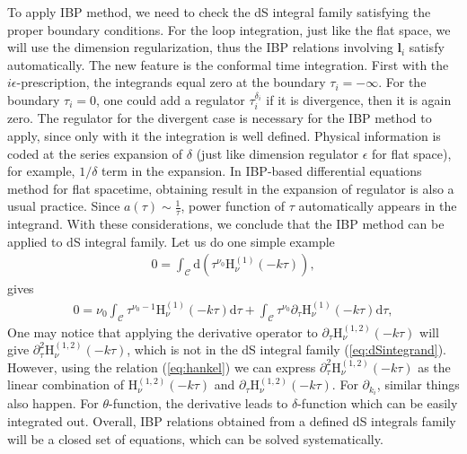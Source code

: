 \documentclass[a4paper,11pt]{article}
\newcommand{\nd}{\mathrm{d}}
\def\eqref#1{(\ref{#1})}
\begin{document}
To apply IBP method, we need to check the  dS integral family satisfying  the proper boundary conditions. 
For the loop integration, just like the flat space, we will  use the dimension regularization,
thus the IBP relations involving $\bm{l}_i$ satisfy automatically. The new feature is the conformal time integration. First with the $i\epsilon$-prescription, the integrands equal zero at the boundary $\tau_i=-\infty$. For the boundary $\tau_i=0$, one could add a regulator $\tau_i^{\delta_i}$ if it is divergence, then it is again zero. The regulator for the divergent case is necessary for the IBP method to apply,
since only with it the integration is well defined. Physical information is coded at the series expansion of $\delta$ (just like dimension regulator $\epsilon$ for flat space), for example, $1/\delta$ term in the expansion. In IBP-based differential equations method for flat spacetime, obtaining result in the expansion of regulator is also a usual practice. Since $a(\tau)\sim \frac{1}{ \tau}$, power function of  $\tau$ automatically appears in the 
integrand. 
With these considerations, we conclude that the IBP method can be applied to dS integral family. 
Let us do one simple  example 
\begin{align}
0=\int_\mathcal{C} \nd \left(\tau^{\nu_0} \text{H}_{\nu}^{(1)} (-k \tau) \right), \label{eq:ibpeg1}
\end{align}
gives
\begin{align}
0=\nu_0 \int_\mathcal{C} \tau^{\nu_0-1} \text{H}_{\nu}^{(1)} (-k \tau)\nd \tau + \int_\mathcal{C} \tau^{\nu_0} \partial_\tau\text{H}_{\nu}^{(1)} (-k \tau)\nd \tau    , \label{eq:ibpeg2}
\end{align}
 One may notice that applying the derivative operator to $\partial_{\tau} \text{H}_{\nu}^{(1,2)}(-k \tau)$ will give $\partial_{\tau}^2 \text{H}_{\nu}^{(1,2)}(-k \tau)$, which is not in the dS integral family \eqref{eq:dSintegrand}. However, using the relation \eqref{eq:hankel} we can express $\partial_{\tau}^2 \text{H}_{\nu}^{(1,2)}(-k \tau)$ as the linear combination of $ \text{H}_{\nu}^{(1,2)}(-k \tau)$ and 
 $\partial_\tau \text{H}_{\nu}^{(1,2)}(-k \tau)$. For $\partial_{k_i}$, similar things also happen. For $\theta$-function, the derivative leads to $\delta$-function which can be easily integrated out. Overall, IBP relations 
 obtained from a defined dS integrals family will be a closed set of equations, which can be solved 
 systematically. 
 


\end{document}
